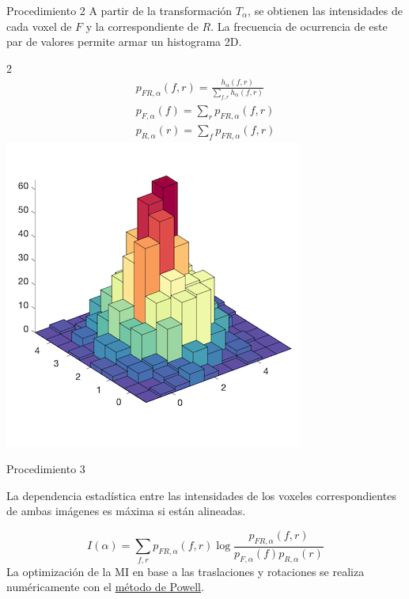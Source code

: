 \documentclass[14pt,xcolor={rgb}]{beamer}
\begin{document}
\begin{frame}{Procedimiento 2}
\small
A partir de la transformaci\'on $T_{\alpha}$, se obtienen las intensidades de cada voxel de $F$ y la correspondiente de $R$. La frecuencia de ocurrencia de este par de valores permite armar un histograma 2D.
\begin{multicols} {2}
	\begin{eqnarray*}
	p_{FR,\alpha}(f,r) = \frac{h_{\alpha}(f,r)}{\sum\limits_{f,r}h_{\alpha}(f,r)}\\
	p_{F,\alpha}(f) = \sum\limits_r p_{FR,\alpha}(f,r)\\
	p_{R,\alpha}(r) = \sum\limits_f p_{FR,\alpha}(f,r)
	\end{eqnarray*}
	\includegraphics[scale=0.4]{Images/hist2d.png}
\end{multicols}
\end{frame}

\begin{frame}{Procedimiento 3}
\small
\begin{tcolorbox}[colback=green!5,colframe=green!40!black,title=Suposici\'on]
La dependencia estad\'istica entre las intensidades de los voxeles correspondientes de ambas im\'agenes es m\'axima si est\'an alineadas.
\end{tcolorbox}
$$I(\alpha) = \sum\limits_{f,r}p_{FR,\alpha}(f,r)\log \frac{p_{FR,\alpha}(f,r)}{p_{F,\alpha}(f)p_{R,\alpha}(r)}$$
La optimizaci\'on de la MI en base a las traslaciones y rotaciones se realiza num\'ericamente con el {\color{blue} \href{https://github.com/BrunoBreggia/Optimization_algorithms}{m\'etodo de Powell}}.
\end{frame}
\end{document}
